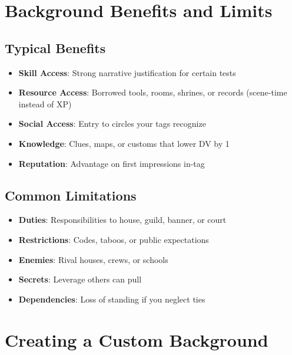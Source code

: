 \section{Background Benefits and Limits}

\subsection*{Typical Benefits}
\begin{itemize}
\item \textbf{Skill Access}: Strong narrative justification for certain tests
\item \textbf{Resource Access}: Borrowed tools, rooms, shrines, or records (scene-time instead of XP)
\item \textbf{Social Access}: Entry to circles your tags recognize
\item \textbf{Knowledge}: Clues, maps, or customs that lower DV by 1
\item \textbf{Reputation}: Advantage on first impressions in-tag
\end{itemize}

\subsection*{Common Limitations}
\begin{itemize}
\item \textbf{Duties}: Responsibilities to house, guild, banner, or court
\item \textbf{Restrictions}: Codes, taboos, or public expectations
\item \textbf{Enemies}: Rival houses, crews, or schools
\item \textbf{Secrets}: Leverage others can pull
\item \textbf{Dependencies}: Loss of standing if you neglect ties
\end{itemize}

\section{Creating a Custom Background}

